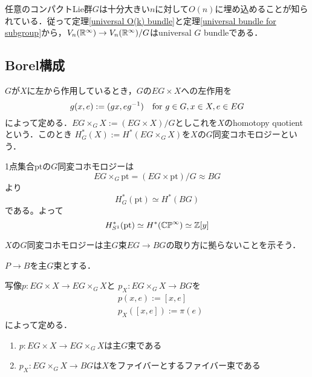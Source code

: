 任意のコンパクトLie群$G$は十分大きい$n$に対して$O(n)$に埋め込めることが知られている\cite{representation}．従って定理\ref{universal O(k) bundle}と定理\ref{universal bundle for subgroup}から，$V_n(\mathbb{R}^\infty)\rightarrow V_n(\mathbb{R}^\infty)/G$はuniversal $G$ bundleである．





\subsection{Borel構成}

\begin{defin}
  $G$が$X$に左から作用しているとき，$G$の$EG\times X$への左作用を
  \[
  g(x, e):=(gx, eg^{-1}) \quad \text{for } g\in G, x\in X, e\in EG 
  \]
  によって定める．$EG\times_GX:=(EG\times X)/G$としこれを$X$のhomotopy quotient という．このとき
  $H^*_G(X):=H^*(EG\times_GX)$を$X$の$G$同変コホモロジーという．
\end{defin}

\begin{eg}
  1点集合$\text{pt}$の$G$同変コホモロジーは
  \[
  EG\times_G\text{pt}=(EG\times \text{pt})/G\approx BG
  \]
  より
  \[
  H^*_G(\text{pt})\simeq H^*(BG)
  \]
  である。よって
  \[
  H^*_{S^1}(\text{pt})\simeq H^*(\mathbb{CP}^\infty)\simeq \mathbb{Z}[y]
  \]
\end{eg}


$X$の$G$同変コホモロジーは主$G$束$EG\rightarrow BG$の取り方に拠らないことを示そう．

$P\rightarrow B$を主$G$束とする．

写像$p\colon EG\times X\rightarrow EG\times_GX$と $p_X\colon EG\times_GX\rightarrow BG$を
\begin{align*}
  &p(x, e):=[x, e]\\
  &p_X([x, e]):=\pi(e)
\end{align*}
によって定める．

\begin{prop}
  \:
  \begin{enumerate}
    \item $p\colon EG\times X\rightarrow EG\times_GX$は主$G$束である
    \item $p_X\colon EG\times_GX\rightarrow BG$は$X$をファイバーとするファイバー束である
  \end{enumerate}
\end{prop}

